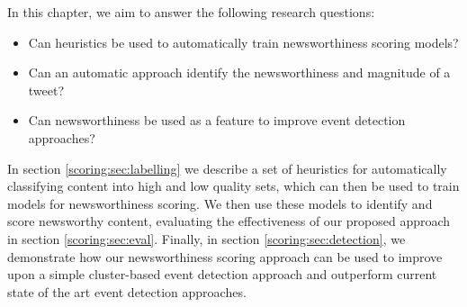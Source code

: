 In this chapter, we aim to answer the following research questions:
\begin{itemize}
	\item Can heuristics be used to automatically train newsworthiness scoring models?
	\item Can an automatic approach identify the newsworthiness and magnitude of a tweet?
	\item Can newsworthiness be used as a feature to improve event detection approaches?
\end{itemize}

In section \ref{scoring:sec:labelling} we describe a set of heuristics for automatically classifying content into high and low quality sets, which can then be used to train models for newsworthiness scoring.
We then use these models to identify and score newsworthy content, evaluating the effectiveness of our proposed approach in section \ref{scoring:sec:eval}.
Finally, in section \ref{scoring:sec:detection}, we demonstrate how our newsworthiness scoring approach can be used to improve upon a simple cluster-based event detection approach and outperform current state of the art event detection approaches.